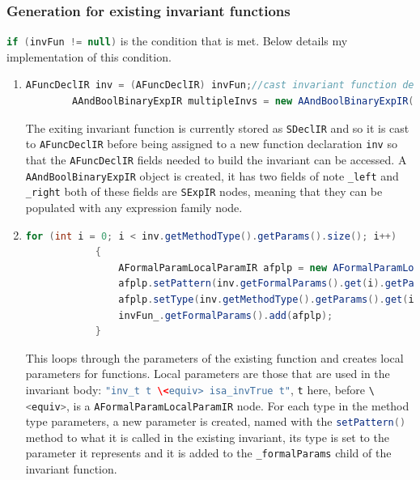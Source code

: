 	\subsubsection{Generation for existing invariant functions}
	\lstinline[language=Java]{if (invFun != null)} is the condition that is met. Below details my implementation of this condition.
	\begin{enumerate}
		\item \begin{lstlisting}[language=Java]
		AFuncDeclIR inv = (AFuncDeclIR) invFun;//cast invariant function declaration to AFuncDeclIR
        AAndBoolBinaryExpIR multipleInvs = new AAndBoolBinaryExpIR();
		\end{lstlisting}
		The exiting invariant function is currently stored as \lstinline[language=Java]{SDeclIR} and so it is cast to \lstinline[language=Java]{AFuncDeclIR} before being assigned to a new function declaration \lstinline[language=Java]{inv} so that the \lstinline[language=Java]{AFuncDeclIR} fields needed to build the invariant can be accessed. A  \lstinline[language=Java]{AAndBoolBinaryExpIR}  object is created, it has two fields of note \lstinline[language=Java]{_left} and \lstinline[language=Java]{_right} both of these fields are \lstinline[language=Java]{SExpIR} nodes, meaning that they can be populated with any expression family node.
		\item \begin{lstlisting}[language=Java] 
		for (int i = 0; i < inv.getMethodType().getParams().size(); i++)
        	{
	        	AFormalParamLocalParamIR afplp = new AFormalParamLocalParamIR();
	            afplp.setPattern(inv.getFormalParams().get(i).getPattern());
	            afplp.setType(inv.getMethodType().getParams().get(i).clone());
	            invFun_.getFormalParams().add(afplp);
        	}
		\end{lstlisting} 
		This loops through the parameters of the existing function and creates local parameters for functions. Local parameters are those that are used in the invariant body: \lstinline[language=Java]{"inv_t t \<equiv> isa_invTrue t"}, \lstinline[language=Java]{t} here, before \lstinline[language=Java]{\<equiv>}, is a \lstinline[language=Java]{AFormalParamLocalParamIR} node. For each type in the method type parameters, a new parameter is created, named with the \lstinline[language=Java]{setPattern()} method to what it is called in the existing invariant, its type is set to the parameter it represents and it is added to the \lstinline[language=Java]{_formalParams} child of the invariant function.

\end{enumerate}
